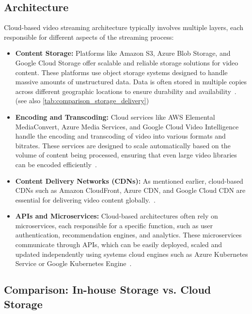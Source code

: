 \subsection{Architecture}
Cloud-based video streaming architecture typically involves multiple layers, each responsible for different aspects of the streaming process:

\begin{itemize}
    \item \textbf{Content Storage:} Platforms like Amazon S3, Azure Blob Storage, and Google Cloud Storage offer scalable and reliable storage solutions for video content. These platforms use object storage systems designed to handle massive amounts of unstructured data. Data is often stored in multiple copies across different geographic locations to ensure durability and availability~\parencite{cloud_streaming}. (see also \autoref{tab:comparison_storage_delivery})
    
    \item \textbf{Encoding and Transcoding:} Cloud services like AWS Elemental MediaConvert, Azure Media Services, and Google Cloud Video Intelligence handle the encoding and transcoding of video into various formats and bitrates. These services are designed to scale automatically based on the volume of content being processed, ensuring that even large video libraries can be encoded efficiently~\parencite{cloud_streaming}.
    
    \item \textbf{Content Delivery Networks (CDNs):} As mentioned earlier, cloud-based \ac{CDN}s such as Amazon CloudFront, Azure CDN, and Google Cloud CDN are essential for delivering video content globally.~\parencite{cloud_streaming}.
    
    \item \textbf{\ac{API}s and Microservices:} Cloud-based architectures often rely on microservices, each responsible for a specific function, such as user authentication, recommendation engines, and analytics. These microservices communicate through \ac{API}s, which can be easily deployed, scaled and updated independently using systems cloud engines such as Azure Kubernetes Service or Google Kubernetes Engine~\parencite{cloud_streaming}.
\end{itemize}

\subsection{Comparison: In-house Storage vs. Cloud Storage}

